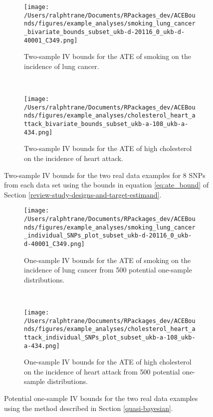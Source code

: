 \documentclass[
]{article}
\theoremstyle{plain}
\begin{document}
\begin{figure*}
  \centering
  \begin{subfigure}{0.5\linewidth}
  \texttt{[image: /Users/ralphtrane/Documents/RPackages\_dev/ACEBounds/figures/example\_analyses/smoking\_lung\_cancer\_bivariate\_bounds\_subset\_ukb-d-20116\_0\_ukb-d-40001\_C349.png]}
  \caption{Two-sample IV bounds for the ATE of smoking on the incidence of lung cancer.}
  \label{fig:two-sample-bounds-smoking}
  \end{subfigure}%
  ~
  \begin{subfigure}{0.5\linewidth}
  \texttt{[image: /Users/ralphtrane/Documents/RPackages\_dev/ACEBounds/figures/example\_analyses/cholesterol\_heart\_attack\_bivariate\_bounds\_subset\_ukb-a-108\_ukb-a-434.png]}
  \caption{Two-sample IV bounds for the ATE of high cholesterol on the incidence of heart attack.}
  \label{fig:two-sample-bounds-cholesterol}
  \end{subfigure}
  \caption{Two-sample IV bounds for the two real data examples for 8 SNPs from each data set using the bounds in equation \eqref{eq:ate_bound} of Section \ref{review-study-designs-and-target-estimand}.}
  \label{fig:two-sample-bounds}
\end{figure*}

\begin{figure*}
  \centering
  \begin{subfigure}{0.5\linewidth}
  \texttt{[image: /Users/ralphtrane/Documents/RPackages\_dev/ACEBounds/figures/example\_analyses/smoking\_lung\_cancer\_individual\_SNPs\_plot\_subset\_ukb-d-20116\_0\_ukb-d-40001\_C349.png]}
  \caption{One-sample IV bounds for the ATE of smoking on the incidence of lung cancer from 500 potential one-sample distributions.}
  \label{fig:one-sample-bounds-smoking}
  \end{subfigure}%
  ~
  \begin{subfigure}{0.5\linewidth}
  \texttt{[image: /Users/ralphtrane/Documents/RPackages\_dev/ACEBounds/figures/example\_analyses/cholesterol\_heart\_attack\_individual\_SNPs\_plot\_subset\_ukb-a-108\_ukb-a-434.png]}
  \caption{One-sample IV bounds for the ATE of high cholesterol on the incidence of heart attack from 500 potential one-sample distributions.}
  \label{fig:one-sample-bounds-cholesterol}
  \end{subfigure}
  \caption{Potential one-sample IV bounds for the two real data examples using the method described in Section \ref{quasi-bayesian}.}
  \label{fig:one-sample-bounds}
\end{figure*}
\end{document}
